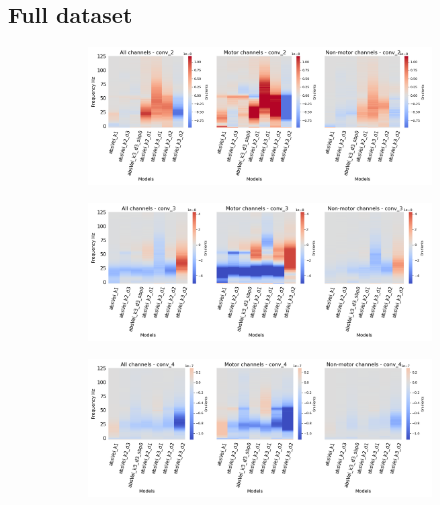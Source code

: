 \subsection*{Full dataset}\label{subsec:absVel-full-dataset-appendixA}
\begin{figure}[!htpb]
\centering
\begin{subfigure}[a]{\textwidth}
   \includegraphics[width=1\linewidth]{img/appendix/A/conv-2/m/absVel-model-gradients-all_kinds}
   \caption{}
   \label{fig:absVel-full-grads-conv-2}
\end{subfigure}

\begin{subfigure}[b]{\textwidth}
   \includegraphics[width=1\linewidth]{img/appendix/A/conv-3/m/absVel-model-gradients-all_kinds}
   \caption{}
   \label{fig:absVel-full-grads-conv-3}
\end{subfigure}

\begin{subfigure}[c]{\textwidth}
   \includegraphics[width=1\linewidth]{img/appendix/A/conv-4/m/absVel-model-gradients_all_kinds}
   \caption{}
   \label{fig:absVel-full-grads-conv-4}
\end{subfigure}


\end{figure}

